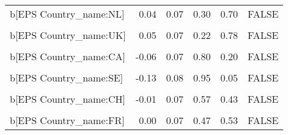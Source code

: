 \begin{table}
\begin{tabular}[t]{lrrrrl}
b[EPS Country\_name:NL] & 0.04 & 0.07 & 0.30 & 0.70 & FALSE\\
\cellcolor{gray!10}{b[(Intercept) Country\_name:UK]} & \cellcolor{gray!10}{0.05} & \cellcolor{gray!10}{0.19} & \cellcolor{gray!10}{0.41} & \cellcolor{gray!10}{0.59} & \cellcolor{gray!10}{FALSE}\\
b[EPS Country\_name:UK] & 0.05 & 0.07 & 0.22 & 0.78 & FALSE\\
\cellcolor{gray!10}{b[(Intercept) Country\_name:CA]} & \cellcolor{gray!10}{-0.05} & \cellcolor{gray!10}{0.19} & \cellcolor{gray!10}{0.61} & \cellcolor{gray!10}{0.39} & \cellcolor{gray!10}{FALSE}\\
b[EPS Country\_name:CA] & -0.06 & 0.07 & 0.80 & 0.20 & FALSE\\
\cellcolor{gray!10}{b[(Intercept) Country\_name:SE]} & \cellcolor{gray!10}{-0.10} & \cellcolor{gray!10}{0.23} & \cellcolor{gray!10}{0.67} & \cellcolor{gray!10}{0.33} & \cellcolor{gray!10}{FALSE}\\
b[EPS Country\_name:SE] & -0.13 & 0.08 & 0.95 & 0.05 & FALSE\\
\cellcolor{gray!10}{b[(Intercept) Country\_name:CH]} & \cellcolor{gray!10}{-0.01} & \cellcolor{gray!10}{0.19} & \cellcolor{gray!10}{0.52} & \cellcolor{gray!10}{0.48} & \cellcolor{gray!10}{FALSE}\\
b[EPS Country\_name:CH] & -0.01 & 0.07 & 0.57 & 0.43 & FALSE\\
\cellcolor{gray!10}{b[(Intercept) Country\_name:FR]} & \cellcolor{gray!10}{0.00} & \cellcolor{gray!10}{0.19} & \cellcolor{gray!10}{0.49} & \cellcolor{gray!10}{0.51} & \cellcolor{gray!10}{FALSE}\\
b[EPS Country\_name:FR] & 0.00 & 0.07 & 0.47 & 0.53 & FALSE\\
\bottomrule
\end{tabular}
\end{table}
